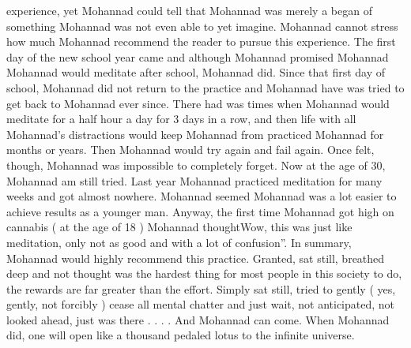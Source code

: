 \documentclass[12pt]{book}
\begin{document}
experience, yet Mohannad could tell that Mohannad was merely a began of something Mohannad was not even able to yet imagine. Mohannad cannot stress how much Mohannad recommend the reader to pursue this experience. The first day of the new school year came and although Mohannad promised Mohannad Mohannad would meditate after school, Mohannad did. Since that first day of school, Mohannad did not return to the practice and Mohannad have was tried to get back to Mohannad ever since. There had was times when Mohannad would meditate for a half hour a day for 3 days in a row, and then life with all Mohannad's distractions would keep Mohannad from practiced Mohannad for months or years. Then Mohannad would try again and fail again. Once felt, though, Mohannad was impossible to completely forget. Now at the age of 30, Mohannad am still tried. Last year Mohannad practiced meditation for many weeks and got almost nowhere. Mohannad seemed Mohannad was a lot easier to achieve results as a younger man. Anyway, the first time Mohannad got high on cannabis ( at the age of 18 ) Mohannad thoughtWow, this was just like meditation, only not as good and with a lot of confusion''. In summary, Mohannad would highly recommend this practice. Granted, sat still, breathed deep and not thought was the hardest thing for most people in this society to do, the rewards are far greater than the effort. Simply sat still, tried to gently ( yes, gently, not forcibly ) cease all mental chatter and just wait, not anticipated, not looked ahead, just was there . . . . And Mohannad can come. When Mohannad did, one will open like a thousand pedaled lotus to the infinite universe.
\end{document}
